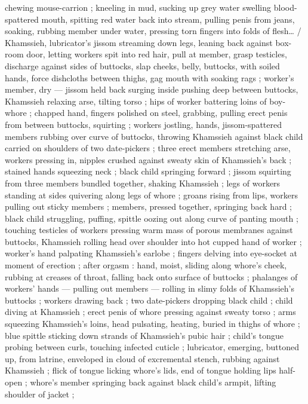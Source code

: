 chewing %
mouse-carrion ; kneeling in mud, sucking up grey water swelling blood-spattered mouth, spitting red
water back into stream, pulling penis from jeans, soaking, rubbing member under water, pressing torn
fingers into folds of flesh{\ldots} {\slash} Khamssieh, lubricator's jissom streaming down legs,
leaning back against box-room door, letting workers spit into red hair, pull at member, grasp
testicles, discharge against sides of buttocks, slap cheeks, belly, buttocks, with soiled hands,
force dishcloths between thighs, gag mouth with soaking rags ; worker's member, dry --- jissom held
back surging inside {\dashcom} pushing deep between buttocks, Khamssieh relaxing arse, tilting torso
; hips of worker battering loins of boy-whore ; chapped hand, fingers polished on steel, grabbing,
pulling erect penis from between buttocks, squirting ; workers jostling, hands, jissom-spattered
members rubbing over curve of buttocks, throwing Khamssieh against black child carried on shoulders
of two date-pickers ; three erect members stretching arse, workers pressing in, nipples crushed
against sweaty skin of Khamssieh's back ; stained hands squeezing neck ; black child springing
forward ; jissom squirting from three members bundled together, shaking Khamssieh ; legs of workers
standing at sides quivering along legs of whore ; groans rising from lips, workers pulling out
sticky members ; members, pressed together, springing back hard ; black child struggling, puffing,
spittle oozing out along curve of panting mouth ; touching testicles of workers pressing warm mass
of porous membranes against buttocks, Khamssieh rolling head over shoulder into hot cupped hand of
worker ; worker's hand palpating Khamssieh's earlobe ; fingers delving into eye-socket at moment of
erection ; after orgasm : hand, moist, sliding along whore's cheek, rubbing at creases of throat,
falling back onto surface of buttocks ; phalanges of workers' hands --- pulling out members ---
rolling in slimy folds of Khamssieh's buttocks ; workers drawing back ; two date-pickers dropping
black child ; child diving at Khamssieh ; erect penis of whore pressing against sweaty torso ; arms
squeezing Khamssieh's loins, head pulsating, heating, buried in thighs of whore ; blue spittle
sticking %
down strands of Khamssieh's pubic hair ; child's tongue probing between curls, touching infected
cuticle ; lubricator, emerging, buttoned up, from latrine, enveloped in cloud of excremental stench,
rubbing against Khamssieh ; flick of tongue licking whore's lids, end of tongue holding lips
half-open ; whore's member springing back against black child's armpit, lifting shoulder of jacket ;
